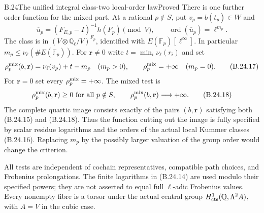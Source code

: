 \begin{statement}{B.24}{The unified integral class-two local-order law}{Proved}
There is one further order function for the mixed part.
At a rational $p\notin S$, put $v_p=b(t_p)\in W$ and
\[
 \overline u_p=
  (F_{E,p}-I)^{-1}h(F_p)\pmod V,\qquad
 \operatorname{ord}(\overline u_p)=\ell^{m_p}.
                                                               \tag{B.24.16}
\]
The class is in $(V\otimes\mathbb Q_\ell/V)^{F_p}$,
identified with $E(\mathbb F_p)[\ell^\infty]$. In particular
$m_p\leq\nu_\ell(\#E(\mathbb F_p))$. For $\mathbf r\ne0$
write $t=\min_i\nu_\ell(r_i)$ and set
\[
 \rho^{\rm mix}_p(b,\mathbf r)
  =\nu_\ell(v_p)+t-m_p\quad(m_p>0),\qquad
 \rho^{\rm mix}_p=+\infty\quad(m_p=0).
                                                               \tag{B.24.17}
\]
For $\mathbf r=0$ set every $\rho^{\rm mix}_p=+\infty$.
The mixed test is
\[
 \rho^{\rm mix}_p(b,\mathbf r)\geq0\text{ for all }p\notin S,
 \qquad
 \rho^{\rm mix}_p(b,\mathbf r)\longrightarrow+\infty .
                                                               \tag{B.24.18}
\]
The complete quartic image consists exactly of the pairs
$(b,\mathbf r)$ satisfying both (B.24.15) and (B.24.18).
Thus the function cutting out the image is fully specified
by scalar residue logarithms and the orders of the actual
local Kummer classes (B.24.16). Replacing $m_p$ by the
possibly larger valuation of the group order would change
the criterion.

All tests are independent of cochain representatives,
compatible path choices, and Frobenius prolongations.
The finite logarithms in (B.24.14) are used modulo their
specified powers; they are not asserted to equal full
$\ell$-adic Frobenius values. Every nonempty fibre is a
torsor under the actual central group
$H^1_{\rm cts}(\mathbb Q,\Lambda^2 A)$, with $A=V$
in the cubic case.
\end{statement}
